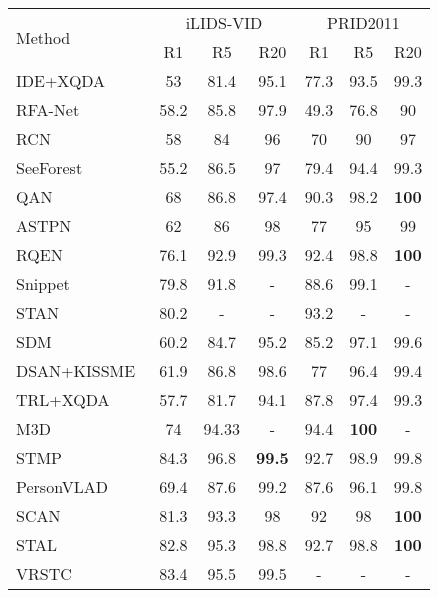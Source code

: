 \documentclass[journal]{IEEEtran}
\begin{document}
\begin{table}[t]
    \centering
        \begin{tabular}{ l | c | c | c | c | c | c  }
            \hline
            \multirow{2}{*}{Method} & \multicolumn{3}{c|}{iLIDS-VID} &\multicolumn{3}{c}{PRID2011} \\\cline{2-7}
            & R1 & R5 & R20       & R1 & R5 & R20 \\ \hline
            IDE+XQDA~\cite{Zheng_2016_ECCV} & 53 & 81.4 & 95.1 & 77.3 & 93.5 & 99.3 \\
            RFA-Net~\cite{Yan_2016_ECCV} & 58.2 & 85.8 & 97.9 & 49.3 & 76.8 & 90 \\
            RCN~\cite{McLaughlin_2016_CVPR} & 58 & 84 & 96 & 70 & 90 & 97 \\
            SeeForest~\cite{Zhou_2017_CVPR} & 55.2 & 86.5 & 97 & 79.4 & 94.4 & 99.3 \\
            QAN~\cite{Liu_2017_CVPR} & 68 & 86.8 & 97.4 & 90.3 & 98.2 & \textbf{100} \\
            ASTPN~\cite{Xu_2017_ICCV} & 62 & 86 & 98 & 77 & 95 & 99 \\
RQEN~\cite{Song_2018_AAAI} & 76.1 & 92.9 & 99.3 & 92.4 & 98.8 & \textbf{100} \\
            Snippet~\cite{Chen_2018_CVPR} & 79.8 & 91.8 & - & 88.6 & 99.1 & - \\
            STAN~\cite{Li_2018_CVPR} & 80.2 & - & - & 93.2 & - & - \\
            SDM~\cite{Zhang_2018_CVPR} & 60.2 & 84.7 & 95.2 & 85.2 & 97.1 & 99.6 \\
            DSAN+KISSME~\cite{Wu_2018_TMM} & 61.9 & 86.8 & 98.6 & 77 & 96.4 & 99.4 \\
            TRL+XQDA~\cite{Dai_2018_TIP} & 57.7 & 81.7 & 94.1 & 87.8 & 97.4 & 99.3 \\
            M3D~\cite{Li_2019_AAAI} & 74 & 94.33 & - & 94.4 & \textbf{100} & - \\
            STMP~\cite{Liu_2019_AAAI} & 84.3 & 96.8 & \textbf{99.5} & 92.7 & 98.9 & 99.8 \\
            PersonVLAD~\cite{Wu_2019_TNNLS} & 69.4 & 87.6 & 99.2 & 87.6 & 96.1 & 99.8 \\
SCAN~\cite{Zhang_2019_TIP} & 81.3 & 93.3 & 98 & 92 & 98 & \textbf{100} \\
            STAL~\cite{Chen_2019_TIP} & 82.8 & 95.3 & 98.8 & 92.7 & 98.8 & \textbf{100} \\
            VRSTC~\cite{Hou_2019_CVPR} & 83.4 & 95.5 & 99.5 & - & - & - \\ \hline

\end{tabular}
\end{table}
\end{document}
